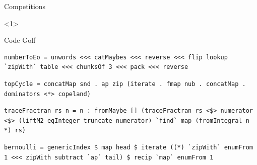 \documentclass{beamer}
\begin{document}
\begin{frame}[fragile]{Competitions}
\begin{onlyenv}<1>

\centerline{Code Golf}
\vspace{15pt}
\tiny
\begin{lstlisting}
numberToEo = unwords <<< catMaybes <<< reverse <<< flip lookup `zipWith` table <<< chunksOf 3 <<< pack <<< reverse
\end{lstlisting}
\begin{lstlisting}
topCycle = concatMap snd . ap zip (iterate . fmap nub . concatMap . dominators <*> copeland)
\end{lstlisting}
\begin{lstlisting}
traceFractran rs n = n : fromMaybe [] (traceFractran rs <$> numerator <$> (liftM2 eqInteger truncate numerator) `find` map (fromIntegral n *) rs)
\end{lstlisting}
\begin{lstlisting}
bernoulli = genericIndex $ map head $ iterate ((*) `zipWith` enumFrom 1 <<< zipWith subtract `ap` tail) $ recip `map` enumFrom 1
\end{lstlisting}





\end{onlyenv}
\end{frame}
\end{document}
